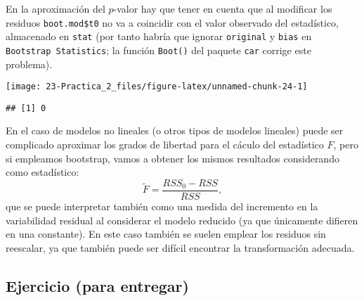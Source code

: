 \documentclass[
]{book}
\newenvironment{Shaded}{\begin{snugshade}}{\end{snugshade}}
\newcommand{\DataTypeTok}[1]{\textcolor[rgb]{0.13,0.29,0.53}{#1}}
\newcommand{\DecValTok}[1]{\textcolor[rgb]{0.00,0.00,0.81}{#1}}
\newcommand{\KeywordTok}[1]{\textcolor[rgb]{0.13,0.29,0.53}{\textbf{#1}}}
\newcommand{\NormalTok}[1]{#1}
\newcommand{\OperatorTok}[1]{\textcolor[rgb]{0.81,0.36,0.00}{\textbf{#1}}}
\newcommand{\OtherTok}[1]{\textcolor[rgb]{0.56,0.35,0.01}{#1}}
\newcommand{\StringTok}[1]{\textcolor[rgb]{0.31,0.60,0.02}{#1}}
\theoremstyle{definition}
\theoremstyle{definition}
\theoremstyle{definition}
\theoremstyle{remark}
\begin{document}
En la aproximación del \(p\)-valor hay que tener en cuenta que al modificar los residuos
\texttt{boot.mod\$t0} no va a coincidir con el valor observado del estadístico,
almacenado en \texttt{stat} (por tanto habría que ignorar \texttt{original} y \texttt{bias}
en \texttt{Bootstrap\ Statistics};
la función \texttt{Boot()} del paquete \texttt{car} corrige este problema).

\begin{Shaded}
\end{Shaded}

\begin{center}\texttt{[image: 23-Practica\_2\_files/figure-latex/unnamed-chunk-24-1]} \end{center}

\begin{Shaded}
\end{Shaded}

\begin{verbatim}
## [1] 0
\end{verbatim}

En el caso de modelos no lineales (o otros tipos de modelos lineales) puede ser
complicado aproximar los grados de libertad para el cáculo del estadístico \(F\),
pero si empleamos bootstrap, vamos a obtener los mismos resultados considerando
como estadístico:
\[\tilde F =\frac{RSS_0 - RSS}{RSS},\]
que se puede interpretar también como una medida del incremento en la variabilidad residual
al considerar el modelo reducido (ya que únicamente difieren en una constante).
En este caso también se suelen emplear los residuos sin reescalar, ya que también puede ser
difícil encontrar la transformación adecuada.

\hypertarget{ejercicio-para-entregar-2}{%
\subsection{Ejercicio (para entregar)}\label{ejercicio-para-entregar-2}}
\end{document}
